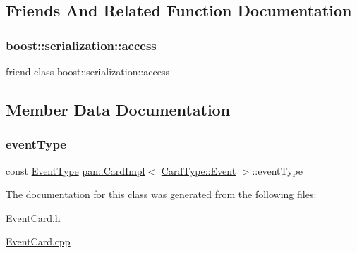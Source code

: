 \subsection{Friends And Related Function Documentation}
\mbox{\label{classpan_1_1_card_impl_3_01_card_type_1_1_event_01_4_ac98d07dd8f7b70e16ccb9a01abf56b9c}} 
\subsubsection{\texorpdfstring{boost\+::serialization\+::access}{boost::serialization::access}}
{\footnotesize\ttfamily friend class boost\+::serialization\+::access\hspace{0.3cm}{\ttfamily [friend]}}



\subsection{Member Data Documentation}
\mbox{\label{classpan_1_1_card_impl_3_01_card_type_1_1_event_01_4_a575f1457eebafca8f0c975bdec2258e2}} 
\subsubsection{\texorpdfstring{event\+Type}{eventType}}
{\footnotesize\ttfamily const \hyperlink{namespacepan_a9221a73b34e019e6b8fe6f84e6417513}{Event\+Type} \hyperlink{classpan_1_1_card_impl}{pan\+::\+Card\+Impl}$<$ \hyperlink{namespacepan_a1f7350bfd0421afeabe9fa95c16fa811aa4ecfc70574394990cf17bd83df499f7}{Card\+Type\+::\+Event} $>$\+::event\+Type}



The documentation for this class was generated from the following files\+:\begin{DoxyCompactItemize}
\item 
\hyperlink{_event_card_8h}{Event\+Card.\+h}\item 
\hyperlink{_event_card_8cpp}{Event\+Card.\+cpp}\end{DoxyCompactItemize}

